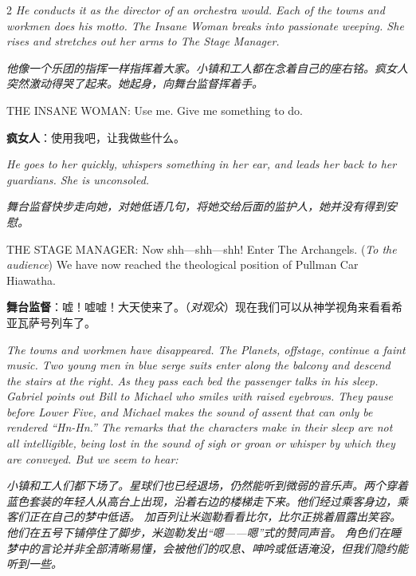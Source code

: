 \documentclass[lang=cn,newtx,10pt,scheme=chinese]{elegantbook}
\newcommand{\pair}[2]{%
\switchcolumn* #2\par
\switchcolumn  #1\par
}
\begin{document}
\begin{paracol}{2}
\pair{
    \textit{他像一个乐团的指挥一样指挥着大家。小镇和工人都在念着自己的座右铭。疯女人突然激动得哭了起来。她起身，向舞台监督挥着手。}
}{
    \textit{He conducts it as the director of an orchestra would. Each of the towns and workmen does his motto. The Insane Woman breaks into passionate weeping. She rises and stretches out her arms to The Stage Manager.}
    \newline
}

\pair{
    \textbf{疯女人}：使用我吧，让我做些什么。
}{
    THE INSANE WOMAN: Use me. Give me something to do.
    \newline
}

\pair{
    \textit{舞台监督快步走向她，对她低语几句，将她交给后面的监护人，她并没有得到安慰。}
}{
    \textit{He goes to her quickly, whispers something in her ear, and leads her back to her guardians. She is unconsoled.}
    \newline
}

\pair{
    \textbf{舞台监督}：嘘！嘘嘘！大天使来了。（\textit{对观众}）现在我们可以从神学视角来看看希亚瓦萨号列车了。
}{
    THE STAGE MANAGER: Now shh—shh—shh! Enter The Archangels. (\textit{To the audience}) We have now reached the theological position of Pullman Car Hiawatha.
    \newline
}

\pair{
    \textit{小镇和工人们都下场了。星球们也已经退场，仍然能听到微弱的音乐声。两个穿着蓝色套装的年轻人从高台上出现，沿着右边的楼梯走下来。他们经过乘客身边，乘客们正在自己的梦中低语。
    \newline
    加百列让米迦勒看看比尔，比尔正挑着眉露出笑容。他们在五号下铺停住了脚步，米迦勒发出“嗯——嗯”式的赞同声音。
    \newline
    角色们在睡梦中的言论并非全部清晰易懂，会被他们的叹息、呻吟或低语淹没，但我们隐约能听到一些。}
}{
    \textit{The towns and workmen have disappeared. The Planets, offstage, continue a faint music. Two young men in blue serge suits enter along the balcony and descend the stairs at the right. As they pass each bed the passenger talks in his sleep.
    \newline
    Gabriel points out Bill to Michael who smiles with raised eyebrows. They pause before Lower Five, and Michael makes the sound of assent that can only be rendered “Hn-Hn.”
    \newline
    The remarks that the characters make in their sleep are not all intelligible, being lost in the sound of sigh or groan or whisper by which they are conveyed. But we seem to hear:}
}


\end{paracol}
\end{document}
